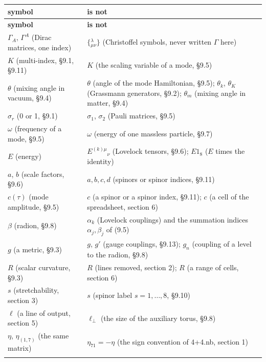 \documentclass[10pt,a4paper]{article}
\begin{document}
{\footnotesize
\begin{longtable}{>{\raggedright\arraybackslash}p{}>{\raggedright\arraybackslash}p{}}
\toprule
\textbf{symbol} & \textbf{is not} \\
\midrule\endfirsthead
\toprule
\textbf{symbol} & \textbf{is not} \\
\midrule\endhead
\endfoot
\bottomrule\endlastfoot
$\Gamma_A$, $\Gamma^A$ (Dirac matrices, one index) & $\{{}^{\lambda}_{\mu\nu}\}$ (Christoffel symbols, never written $\Gamma$ here) \\
$K$ (multi-index, §9.1, §9.11) & $K$ (the scaling variable of a mode, §9.5) \\
$\theta$ (mixing angle in vacuum, §9.4) & $\theta$ (angle of the mode Hamiltonian, §9.5); $\theta_k$, $\theta_K$ (Grassmann generators, §9.2); $\theta_m$ (mixing angle in matter, §9.4) \\
$\sigma_r$ (0 or 1, §9.1) & $\sigma_1$, $\sigma_2$ (Pauli matrices, §9.5) \\
$\omega$ (frequency of a mode, §9.5) & $\omega$ (energy of one massless particle, §9.7) \\
$E$ (energy) & $E^{(k)\mu}{}_\nu$ (Lovelock tensors, §9.6); $E1_8$ ($E$ times the identity) \\
$a$, $b$ (scale factors, §9.6) & $a,b,c,d$ (spinors or spinor indices, §9.11) \\
$c(\tau)$ (mode amplitude, §9.5) & $c$ (a spinor or a spinor index, §9.11); $c$ (a cell of the spreadsheet, section 6) \\
$\beta$ (radion, §9.8) & $\alpha_k$ (Lovelock couplings) and the summation indices $\alpha_j,\beta_j$ of (9.5) \\
$g$ (a metric, §9.3) & $g$, $g'$ (gauge couplings, §9.13); $g_n$ (coupling of a level to the radion, §9.8) \\
$R$ (scalar curvature, §9.3) & $R$ (lines removed, section 2); $R$ (a range of cells, section 6) \\
$s$ (stretchability, section 3) & $s$ (spinor label $s=1,\dots,8$, §9.10) \\
$\ell$ (a line of output, section 5) & $\ell_\perp$ (the size of the auxiliary torus, §9.8) \\
$\eta$, $\eta_{(1,7)}$ (the same matrix) & $\eta_{71}=-\eta$ (the sign convention of 4+4.nb, section 1) \\*
\end{longtable}}
\end{document}
